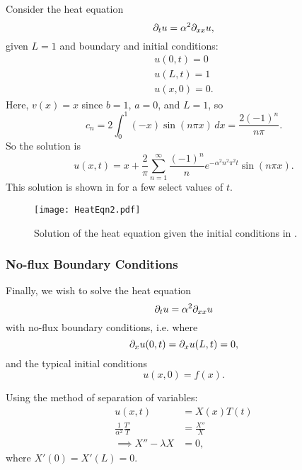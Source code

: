 \begin{eg}\label{eg:heateqn2}
	Consider the heat equation
	\[
	\partial_t u = \alpha^2 \partial_{xx} u,
	\]
	given $L=1$ and boundary and initial conditions:
	\begin{align*}
		u(0,t) = 0 \\
		u(L,t) = 1 \\
		u(x,0) = 0.
	\end{align*} 
	Here, $v(x) = x$ since $b=1$, $a=0$, and $L=1$, so
	\[
	c_n = 2 \int_{0}^1 (-x) \sin{\left(n \pi x \right)} \,dx = \frac{2(-1)^n}{n \pi}.
	\]
	So the solution is
	\[
	u(x,t) = x + \frac{2}{\pi} \sum_{n=1}^{\infty} \frac{(-1)^n}{n} e^{-\alpha^2 n^2 \pi^2 t}\sin{\left(n \pi x \right)}.
	\]
	This solution is shown in  for a few select values of $t$.
\end{eg}

\begin{figure}[!ht]
	\centering
	\texttt{[image: HeatEqn2.pdf]}
	\caption{Solution of the heat equation given the initial conditions in .}
	\label{fig:heateqneg2}
\end{figure}

\subsubsection{No-flux Boundary Conditions}

Finally, we wish to solve the heat equation
\[
\partial_t u = \alpha^2 \partial_{xx} u
\] 
with no-flux boundary conditions, i.e. where
\[
\partial_x u(0,t) = \partial_x u(L,t) = 0,
\]
and the typical initial conditions
\[
u(x,0) = f(x).
\]

Using the method of separation of variables:
\begin{align*}
	u(x,t) &= X(x) T(t) \\
	\frac{1}{\alpha^2} \frac{T'}{T} &= \frac{X''}{X} \\
	\implies X'' - \lambda X &= 0,
\end{align*}
where $X'(0) = X'(L) = 0$.

